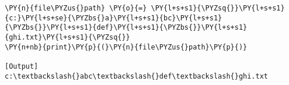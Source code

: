 \begin{Verbatim}[label=\makebox{\href{https://github.com/unipi-physics-labs/statnotes/tree/main/snippy/dos_path_escape.py}{https://github.com/.../dos\_path\_escape.py}},commandchars=\\\{\}]
\PY{n}{file\PYZus{}path} \PY{o}{=} \PY{l+s+s1}{\PYZsq{}}\PY{l+s+s1}{c:}\PY{l+s+se}{\PYZbs{}a}\PY{l+s+s1}{bc}\PY{l+s+s1}{\PYZbs{}}\PY{l+s+s1}{def}\PY{l+s+s1}{\PYZbs{}}\PY{l+s+s1}{ghi.txt}\PY{l+s+s1}{\PYZsq{}}
\PY{n+nb}{print}\PY{p}{(}\PY{n}{file\PYZus{}path}\PY{p}{)}

[Output]
c:\textbackslash{}abc\textbackslash{}def\textbackslash{}ghi.txt
\end{Verbatim}
